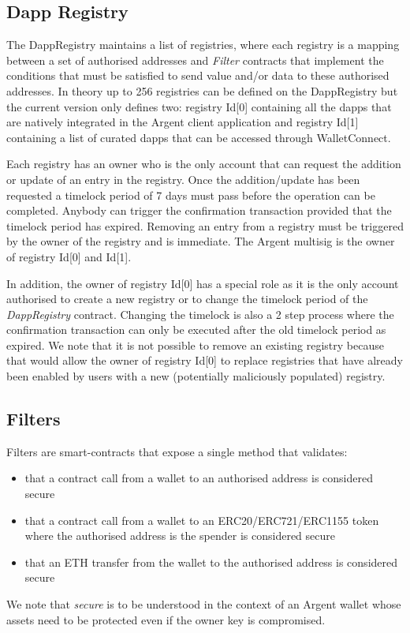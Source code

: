 \documentclass[12pt]{article}
\begin{document}
\subsection{Dapp Registry}

The DappRegistry maintains a list of registries, where each registry is a mapping between a set of authorised addresses and \emph{Filter} contracts that implement the conditions that must be satisfied to send value and/or data to these authorised addresses. In theory up to 256 registries can be defined on the DappRegistry but the current version only defines two: registry Id[0] containing all the dapps that are natively integrated in the Argent client application and registry Id[1] containing a list of curated dapps that can be accessed through WalletConnect. 

Each registry has an owner who is the only account that can request the addition or update of an entry in the registry. Once the addition/update has been requested a timelock period of 7 days must pass before the operation can be completed. Anybody can trigger the confirmation transaction provided that the timelock period has expired. Removing an entry from a registry must be triggered by the owner of the registry and is immediate. The Argent multisig is the owner of registry Id[0] and Id[1].

In addition, the owner of registry Id[0] has a special role as it is the only account authorised to create a new registry or to change the timelock period of the \emph{DappRegistry} contract. Changing the timelock is also a 2 step process where the confirmation transaction can only be executed after the old timelock period as expired. We note that it is not possible to remove an existing registry because that would allow the owner of registry Id[0] to replace registries that 
have already been enabled by users with a new (potentially maliciously populated) registry.

\subsection{Filters}
\label{sec:filters}

Filters are smart-contracts that expose a single method that validates:
\begin{itemize}
    \item that a contract call from a wallet to an authorised address is considered secure
    \item that a contract call from a wallet to an ERC20/ERC721/ERC1155 token where the authorised address is the spender is considered secure
    \item that an ETH transfer from the wallet to the authorised address is considered secure
\end{itemize}
 We note that \textit{secure} is to be understood in the context of an Argent wallet whose assets need to be protected even if the owner key is compromised. \\
\end{document}
